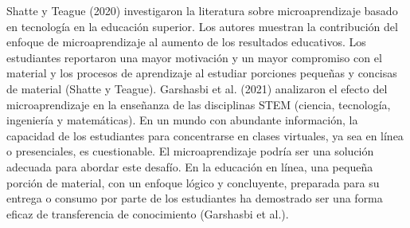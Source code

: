 Shatte y Teague (2020) investigaron la literatura sobre microaprendizaje basado
en tecnología en la educación superior. Los autores muestran la contribución del
enfoque de microaprendizaje al aumento de los resultados educativos. Los
estudiantes reportaron una mayor motivación y un mayor compromiso con el
material y los procesos de aprendizaje al estudiar porciones pequeñas y concisas
de material (Shatte y Teague). Garshasbi et al. (2021) analizaron el efecto del
microaprendizaje en la enseñanza de las disciplinas STEM (ciencia, tecnología,
ingeniería y matemáticas). En un mundo con abundante información, la capacidad
de los estudiantes para concentrarse en clases virtuales, ya sea en línea o
presenciales, es cuestionable. El microaprendizaje podría ser una solución
adecuada para abordar este desafío. En la educación en línea, una pequeña
porción de material, con un enfoque lógico y concluyente, preparada para su
entrega o consumo por parte de los estudiantes ha demostrado ser una forma
eficaz de transferencia de conocimiento (Garshasbi et al.).
\cite{article:elearning_future_trends_shahid}